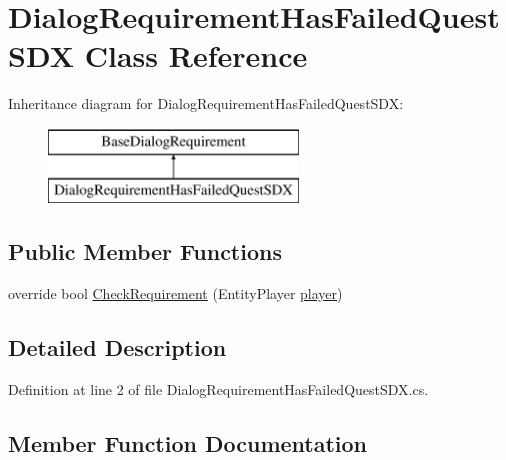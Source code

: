 \hypertarget{class_dialog_requirement_has_failed_quest_s_d_x}{}\section{Dialog\+Requirement\+Has\+Failed\+Quest\+S\+DX Class Reference}
\label{class_dialog_requirement_has_failed_quest_s_d_x}
Inheritance diagram for Dialog\+Requirement\+Has\+Failed\+Quest\+S\+DX\+:\begin{figure}[H]
\begin{center}
\leavevmode
\includegraphics[height=2.000000cm]{class_dialog_requirement_has_failed_quest_s_d_x}
\end{center}
\end{figure}
\subsection*{Public Member Functions}
\begin{DoxyCompactItemize}
\item 
override bool \mbox{\hyperlink{class_dialog_requirement_has_failed_quest_s_d_x_ac660b6533d785fad7192c3d412b4feb2}{Check\+Requirement}} (Entity\+Player \mbox{\hyperlink{_sphere_i_i_01_music_01_boxes_2_config_2_localization_8txt_a4e2cb8aeff651600ea1cc57fe5a929a4}{player}})
\end{DoxyCompactItemize}


\subsection{Detailed Description}


Definition at line 2 of file Dialog\+Requirement\+Has\+Failed\+Quest\+S\+D\+X.\+cs.



\subsection{Member Function Documentation}
\mbox{\label{class_dialog_requirement_has_failed_quest_s_d_x_ac660b6533d785fad7192c3d412b4feb2}} 
